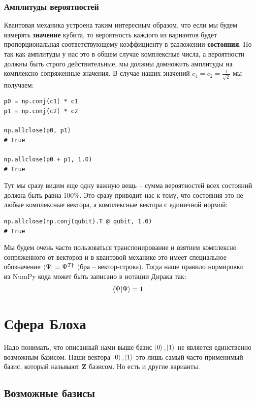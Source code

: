 \documentclass[11pt]{article}
\begin{document}
\subsubsection{Амплитуды вероятностей}
\label{sec:org37b4225}
Квантовая механика устроена таким интересным образом, что если мы будем измерять \textbf{значение} кубита, то вероятность каждого из вариантов будет пропорциональная соответствующему коэффициенту в разложении \textbf{состояния}. Но так как амплитуды у нас это в общем случае комплексные числа, а вероятности должны быть строго действительные, мы должны домножить амплитуды на комплексно сопряженные значения. В случае наших значений \(c_1 = c_2 = \frac{1}{\sqrt{2}}\) мы получаем:
\begin{verbatim}
p0 = np.conj(c1) * c1
p1 = np.conj(c2) * c2

np.allclose(p0, p1)
# True

np.allclose(p0 + p1, 1.0)
# True
\end{verbatim}

Тут мы сразу видим еще одну важную вещь -- сумма вероятностей всех состояний должна быть равна 100\%. Это сразу приводит нас к тому, что состояния это не любые комплексные вектора, а комплексные вектора с единичной нормой:

\begin{verbatim}
np.allclose(np.conj(qubit).T @ qubit, 1.0)
# True
\end{verbatim}

Мы будем очень часто пользоваться транспонирование и взятием комплексно сопряженного от векторов и в квантовой механике это имеет специальное обозначение \(\bra{\Psi} = \Psi^{T\dagger}\) (бра -- вектор-строка). Тогда наше правило нормировки из NumPy кода может быть записано в нотации Дирака так:
\begin{align*}
\bra{\Psi}\ket{\Psi} = 1
\end{align*}

\section{Сфера Блоха}
\label{sec:org28e4257}
Надо понимать, что описанный нами выше базис \(\ket{0}, \ket{1}\) не является единственно возможным базисом. Наши вектора \(\ket{0}, \ket{1}\) это лишь самый часто применимый базис, который называют \(\mathbf{Z}\) базисом. Но есть и другие варианты.


\subsection{Возможные базисы}
\label{sec:org1a40461}
\end{document}
